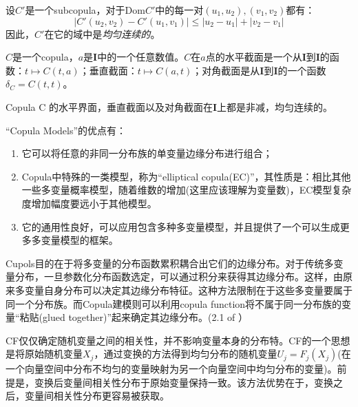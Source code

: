 \begin{theorem}
    设$C'$是一个subcopula，对于Dom$C'$中的每一对$(u_1,u_2),(v_1,v_2)$都有：
    \begin{equation}
        \left|C'(u_2,v_2)-C'(u_1,v_1)\right| \leq \left|u_2-u_1\right|+\left|v_2-v_1\right|
        \label{eq-thr2.2.4}
    \end{equation}
    因此，$C'$在它的域中是\emph{\textcolor[rgb]{1,0,0}{均匀连续的}}。
    \label{thr2.2.4}
\end{theorem}
\begin{definition}
    $C$是一个copula，$a$是$\mathbf{I}$中的一个任意数值。$C$在$a$点的水平截面是一个从$\mathbf{I}$到$\mathbf{I}$的函数：$t \mapsto C(t,a)$；垂直截面：$t \mapsto C(a,t)$；对角截面是从$\mathbf{I}$到$\mathbf{I}$的一个函数$\delta_C = C(t,t)$。
    \label{def2.2.5}
\end{definition}
\begin{corollary}
    Copula C 的水平界面，垂直截面以及对角截面在$\mathbf{I}$上都是非减，均匀连续的。
    \label{coro2.2.6}
\end{corollary}



``Copula Models''的优点有\cite{Smith2009}：
\begin{enumerate}
    \item 它可以将任意的非同一分布族的单变量边缘分布进行组合；
    \item Copula中特殊的一类模型，称为``elliptical copula(EC)''，其性质是：相比其他一些多变量概率模型，随着维数的增加(这里应该理解为变量数)，EC模型复杂度增加幅度要远小于其他模型。
    \item 它的通用性良好，可以应用包含多种多变量模型，并且提供了一个可以生成更多多变量模型的框架。
\end{enumerate}

\textcolor[rgb]{1,0,0}{Cupols目的在于将多变量的分布函数累积耦合出它们的边缘分布。对于传统多变量分布，一旦参数化分布函数选定，可以通过积分来获得其边缘分布。这样，由原来多变量自身分布可以决定其边缘分布特征。这种方法限制在于这些多变量要属于同一个分布族。而Copula建模则可以利用copula function将不属于同一分布族的变量``粘贴(glued together)''起来确定其边缘分布。(2.1 of \cite{Smith2009}}）



CF仅仅确定随机变量之间的相关性，并不影响变量本身的分布特。CF的一个思想是将原始随机变量$X_j$，通过变换的方法得到均匀分布的随机变量$U_j = F_j(X_j)$(在一个向量空间中分布不均匀的变量映射为另一个向量空间中均匀分布的变量)。前提是，变换后变量间相关性分布于原始变量保持一致。该方法优势在于，变换之后，变量间相关性分布更容易被获取。
